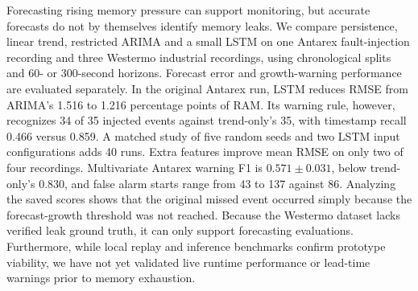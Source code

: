 Forecasting rising memory pressure can support monitoring, but accurate forecasts do not by themselves identify memory leaks. We compare persistence, linear trend, restricted ARIMA and a small LSTM on one Antarex fault-injection recording and three Westermo industrial recordings, using chronological splits and 60- or 300-second horizons. Forecast error and growth-warning performance are evaluated separately. In the original Antarex run, LSTM reduces RMSE from ARIMA's 1.516 to 1.216 percentage points of RAM. Its warning rule, however, recognizes 34 of 35 injected events against trend-only's 35, with timestamp recall 0.466 versus 0.859. A matched study of five random seeds and two LSTM input configurations adds 40 runs. Extra features improve mean RMSE on only two of four recordings. Multivariate Antarex warning F1 is $0.571\pm0.031$, below trend-only's 0.830, and false alarm starts range from 43 to 137 against 86. Analyzing the saved scores shows that the original missed event occurred simply because the forecast-growth threshold was not reached. Because the Westermo dataset lacks verified leak ground truth, it can only support forecasting evaluations. Furthermore, while local replay and inference benchmarks confirm prototype viability, we have not yet validated live runtime performance or lead-time warnings prior to memory exhaustion.
